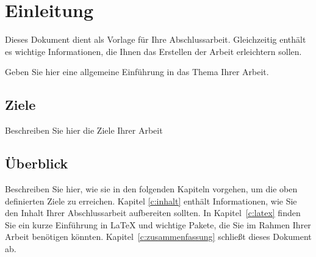 \chapter{Einleitung}
\label{c:einleitung}


Dieses Dokument dient als Vorlage für Ihre Abschlussarbeit.
Gleichzeitig enthält es wichtige Informationen, die Ihnen das
Erstellen der Arbeit erleichtern sollen.

Geben Sie hier eine allgemeine Einführung in das Thema Ihrer Arbeit.

\section{Ziele}
Beschreiben Sie hier die Ziele Ihrer Arbeit

\section{Überblick}
Beschreiben Sie hier, wie sie in den folgenden Kapiteln
  vorgehen, um die oben definierten Ziele zu erreichen.
Kapitel \ref{c:inhalt} enthält Informationen, wie Sie den Inhalt
Ihrer Abschlussarbeit aufbereiten sollten.
In Kapitel~\ref{c:latex} finden Sie ein kurze Einführung in \LaTeX
und wichtige Pakete, die Sie im Rahmen Ihrer Arbeit benötigen
könnten.
Kapitel~\ref{c:zusammenfassung} schließt dieses Dokument ab.



